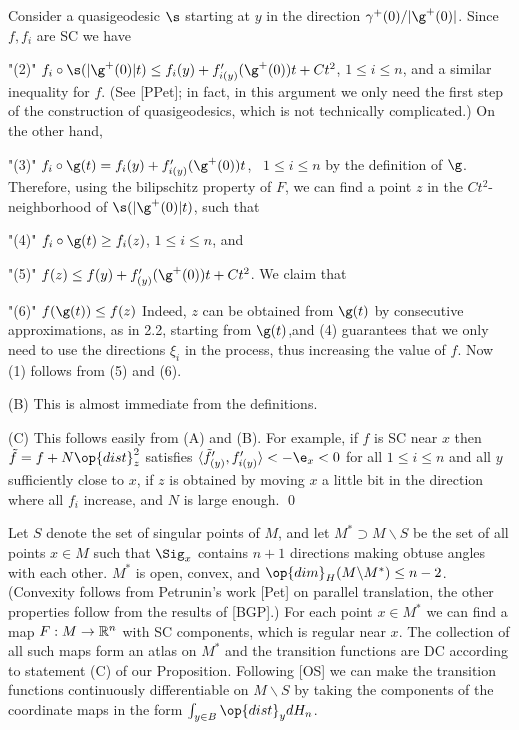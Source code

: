 Consider a quasigeodesic $\s$ starting at $y$ in the direction
$\gamma^+(0)/|\g^+(0)|$. Since $f,f_i$ are SC we have
\roster
\item"(2)" $f_i\circ\s(|\g^+(0)|t)\leq f_i(y)+f'_{i(y)} (\g^+(0))t+Ct^2$,
$1 \leq i\leq n$, and a similar inequality for $f$.
\endroster
(See [PPet]; in fact, in this argument we only need the first step of the
construction of quasigeodesics, which is not technically complicated.)
On the other hand,
\roster
\item"(3)" $f_i\circ\g(t)=f_i(y)+f'_{i(y)} (\g^+(0))t$, \ $1\leq i\leq n$ by the
definition of $\g$.
\endroster
Therefore, using the bilipschitz property of $F$, we can find a point $z$ in the
$Ct^2$-neighborhood of $\s(|\g^+(0)|t)$, such that
\roster
\item"(4)" $f_i\circ\g(t)\geq f_i(z)$, $1\leq i\leq n$, and
\item"(5)" $f(z)\leq f(y)+f'_{(y)}(\g^+(0))t+Ct^2$.
\endroster
We claim that
\roster
\item"(6)" $f(\g(t))\leq f(z)$
\endroster
Indeed, $z$ can be obtained from $\g(t)$ by consecutive approximations, as
in 2.2,
starting from $\g(t)$,and (4) guarantees that we only need to use the directions
$\xi_i$ in the process, thus increasing the value of $f$. Now (1) follows
from (5)
and (6).

(B) This is almost immediate from the definitions.

(C) This follows easily from (A) and (B). For example, if $f$ is SC near $x$
then\linebreak
$\tilde f=f+N {\op{dist}}^2_z$ satisfies
$\langle\tilde f'_{(y)},f'_{i(y)}\rangle < -\e_x < 0$ for all $1\leq i\leq n$
and all $y$ sufficiently close to $x$, if $z$ is obtained by moving $x$ a
little bit
in the direction where all $f_i$ increase, and $N$ is large enough. \qed

\bigskip
Let $S$ denote the set of  singular points of $M$, and let $M^*\supset
M\backslash
S$ be the set of all points $x\in M$ such that $\Sig_x$ contains $n+1$
directions
making obtuse angles with each other. $M^*$ is open, convex, and
${\op{dim}}_H(M\backslash M^*)\leq n-2$. (Convexity follows from Petrunin's work
[Pet] on parallel translation, the other properties follow from the results of
[BGP].) For each point $x\in M^*$ we can find a map $F:M\to\Bbb R^n$ with SC
components, which is regular near $x$. The collection of all such maps form an atlas
on $M^*$ and the transition functions are DC according to  statement (C) of our
Proposition. Following [OS] we can make the transition functions continuously
differentiable on $M\backslash S$ by taking the components of the
coordinate maps in
the form $\int_{y\in B}{\op{dist}}_y dH_n$.

